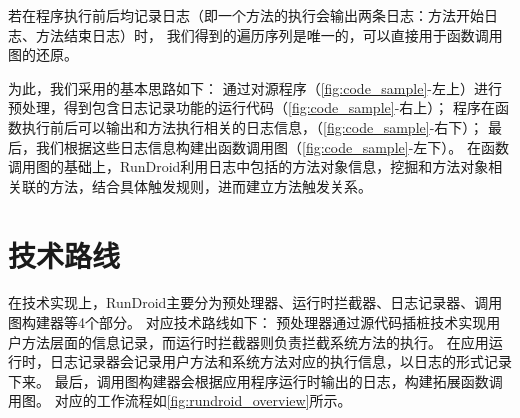 若在程序执行前后均记录日志（即一个方法的执行会输出两条日志：方法开始日志、方法结束日志）时，
我们得到的遍历序列是唯一的，可以直接用于函数调用图的还原。

为此，我们采用的基本思路如下：
通过对源程序（\autoref{fig:code_sample}-左上）进行预处理，得到包含日志记录功能的运行代码（\autoref{fig:code_sample}-右上）；
程序在函数执行前后可以输出和方法执行相关的日志信息，（\autoref{fig:code_sample}-右下）；
最后，我们根据这些日志信息构建出函数调用图（\autoref{fig:code_sample}-左下）。
在函数调用图的基础上，RunDroid利用日志中包括的方法对象信息，挖掘和方法对象相关联的方法，结合具体触发规则，进而建立方法触发关系。


\section{技术路线}

在技术实现上，RunDroid主要分为预处理器、运行时拦截器、日志记录器、调用图构建器等4个部分。
对应技术路线如下：
预处理器通过源代码插桩技术实现用户方法层面的信息记录，而运行时拦截器则负责拦截系统方法的执行。
在应用运行时，日志记录器会记录用户方法和系统方法对应的执行信息，以日志的形式记录下来。
最后，调用图构建器会根据应用程序运行时输出的日志，构建拓展函数调用图。
对应的工作流程如\autoref{fig:rundroid_overview}所示。




